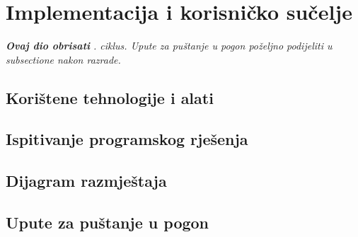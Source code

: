 \chapter{Implementacija i korisničko sučelje}

    \textit{\textbf{Ovaj dio obrisati} . ciklus. Upute za puštanje u pogon poželjno podijeliti u subsectione nakon razrade.}

    \section{Korištene tehnologije i alati}

    \section{Ispitivanje programskog rješenja}
    
    \section{Dijagram razmještaja}
    
    \section{Upute za puštanje u pogon}